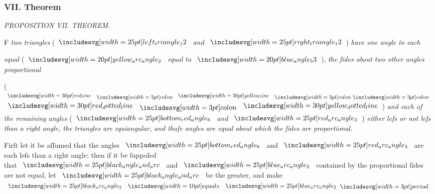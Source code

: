 \documentclass[11pt,preview]{standalone}
\begin{document}
\subsubsection{VII. Theorem}

\begin{minipage}[t]{0.43\textwidth}
    \vspace{20pt}
    
\end{minipage}%
\hfill
\begin{minipage}[t]{0.54\textwidth}
    \begin{center}
        \textit{PROPOSITION VII. THEOREM.}\label{book6pr7} \\
    \end{center}

    \hfill

    \begin{center}
        \raggedright \lettrine[lines=3, loversize=1, nindent=0pt]{}{}F \textit{two triangles} (\hspace{-1ex}$\img{left_triangle_12}$ \textit{and} $\img{right_triangle_12}$\hspace{-1ex}) \textit{have one angle in each}
    \end{center}
    \raggedright \textit{equal} (\hspace{-1ex}$\img[0][0][20]{yellow_arc_angle_2}$ \textit{equal to} $\img[0][0][20]{blue_angle_53}$\hspace{-1ex}), \textit{the ſides about two other angles proportional}
\end{minipage}
\raggedright (\hspace{-1ex}$\redline \bcolon \yellowline \bbcolon$  $\dottedredline \bcolon \dottedyellowline$\hspace{-1ex}) \textit{and each of the remaining angles} (\hspace{-1ex}$\img{bottom_red_angle_6}$ \textit{and} $\img{red_arc_angle_3}$\hspace{-1ex}) \textit{either leſs or not leſs than a right angle, the triangles are equiangular, and thoſe angles are equal about which the ſides are proportional}.

\hfill

\begin{center}
    Firſt let it be aſſumed that the angles $\img{bottom_red_angle_6}$ and $\img{red_arc_angle_3}$ are each leſs than a right angle: then if it be ſuppoſed\\
    that $\img{black_angle_and_arc}$ and $\img{blue_arc_angle_2}$ contained by the proportional ſides\\
    are not equal, let $\img{black_angle_and_arc}$ be the greater, and make\\
    $\img{black_arc_angle_2} \bequals \img{blue_arc_angle_2} \bperiod$
\end{center}
\end{document}
